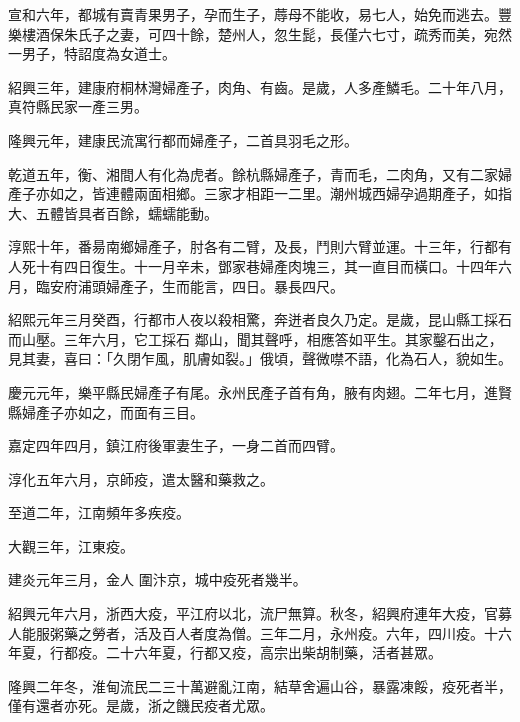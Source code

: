\begin{pinyinscope}
 宣和六年，都城有賣青果男子，孕而生子，蓐母不能收，易七人，始免而逃去。豐樂樓酒保朱氏子之妻，可四十餘，楚州人，忽生髭，長僅六七寸，疏秀而美，宛然一男子，特詔度為女道士。



 紹興三年，建康府桐林灣婦產子，肉角、有齒。是歲，人多產鱗毛。二十年八月，真符縣民家一產三男。



 隆興元年，建康民流寓行都而婦產子，二首具羽毛之形。



 乾道五年，衡、湘間人有化為虎者。餘杭縣婦產子，青而毛，二肉角，又有二家婦
 產子亦如之，皆連體兩面相鄉。三家才相距一二里。潮州城西婦孕過期產子，如指大、五體皆具者百餘，蠕蠕能動。



 淳熙十年，番昜南鄉婦產子，肘各有二臂，及長，鬥則六臂並運。十三年，行都有人死十有四日復生。十一月辛未，鄧家巷婦產肉塊三，其一直目而橫口。十四年六月，臨安府浦頭婦產子，生而能言，四日。暴長四尺。



 紹熙元年三月癸酉，行都市人夜以殺相驚，奔迸者良久乃定。是歲，昆山縣工採石而山壓。三年六月，它工採石
 鄰山，聞其聲呼，相應答如平生。其家鑿石出之，見其妻，喜曰：「久閉乍風，肌膚如裂。」俄頃，聲微噤不語，化為石人，貌如生。



 慶元元年，樂平縣民婦產子有尾。永州民產子首有角，腋有肉翅。二年七月，進賢縣婦產子亦如之，而面有三目。



 嘉定四年四月，鎮江府後軍妻生子，一身二首而四臂。



 淳化五年六月，京師疫，遣太醫和藥救之。



 至道二年，江南頻年多疾疫。



 大觀三年，江東疫。



 建炎元年三月，金人
 圍汴京，城中疫死者幾半。



 紹興元年六月，浙西大疫，平江府以北，流尸無算。秋冬，紹興府連年大疫，官募人能服粥藥之勞者，活及百人者度為僧。三年二月，永州疫。六年，四川疫。十六年夏，行都疫。二十六年夏，行都又疫，高宗出柴胡制藥，活者甚眾。



 隆興二年冬，淮甸流民二三十萬避亂江南，結草舍遍山谷，暴露凍餒，疫死者半，僅有還者亦死。是歲，浙之饑民疫者尤眾。




\end{pinyinscope}
